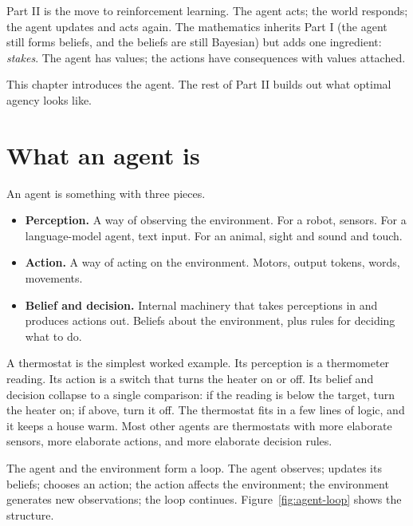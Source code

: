Part II is the move to reinforcement learning. The agent acts; the world responds; the agent updates and acts again. The mathematics inherits Part I (the agent still forms beliefs, and the beliefs are still Bayesian) but adds one ingredient: \emph{stakes}. The agent has values; the actions have consequences with values attached.

This chapter introduces the agent. The rest of Part II builds out what optimal agency looks like.

\section*{What an agent is}

An agent is something with three pieces.

\begin{itemize}
\item \textbf{Perception.} A way of observing the environment. For a robot, sensors. For a language-model agent, text input. For an animal, sight and sound and touch.

\item \textbf{Action.} A way of acting on the environment. Motors, output tokens, words, movements.

\item \textbf{Belief and decision.} Internal machinery that takes perceptions in and produces actions out. Beliefs about the environment, plus rules for deciding what to do.
\end{itemize}

A thermostat is the simplest worked example. Its perception is a thermometer reading. Its action is a switch that turns the heater on or off. Its belief and decision collapse to a single comparison: if the reading is below the target, turn the heater on; if above, turn it off. The thermostat fits in a few lines of logic, and it keeps a house warm. Most other agents are thermostats with more elaborate sensors, more elaborate actions, and more elaborate decision rules.

The agent and the environment form a loop. The agent observes; updates its beliefs; chooses an action; the action affects the environment; the environment generates new observations; the loop continues. Figure~\ref{fig:agent-loop} shows the structure.

